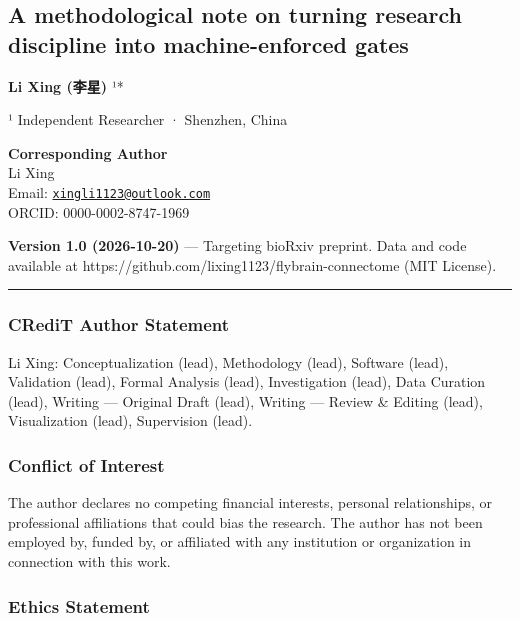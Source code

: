 \documentclass[
]{article}
\begin{document}
\subsection{A methodological note on turning research discipline into
machine-enforced
gates}\label{a-methodological-note-on-turning-research-discipline-into-machine-enforced-gates}

\textbf{Li Xing (李星)} ¹*

¹ Independent Researcher · Shenzhen, China

\textbf{Corresponding Author}\\
Li Xing\\
Email:
\href{mailto:xingli1123@outlook.com}{\nolinkurl{xingli1123@outlook.com}}\\
ORCID: 0000-0002-8747-1969

\textbf{Version 1.0 (2026-10-20)} --- Targeting bioRxiv preprint. Data
and code available at https://github.com/lixing1123/flybrain-connectome
(MIT License).

\begin{center}\rule{0.5\linewidth}{0.5pt}\end{center}

\subsubsection{CRediT Author Statement}\label{credit-author-statement}

Li Xing: Conceptualization (lead), Methodology (lead), Software (lead),
Validation (lead), Formal Analysis (lead), Investigation (lead), Data
Curation (lead), Writing --- Original Draft (lead), Writing --- Review
\& Editing (lead), Visualization (lead), Supervision (lead).

\subsubsection{Conflict of Interest}\label{conflict-of-interest}

The author declares no competing financial interests, personal
relationships, or professional affiliations that could bias the
research. The author has not been employed by, funded by, or affiliated
with any institution or organization in connection with this work.

\subsubsection{Ethics Statement}\label{ethics-statement}
\end{document}
